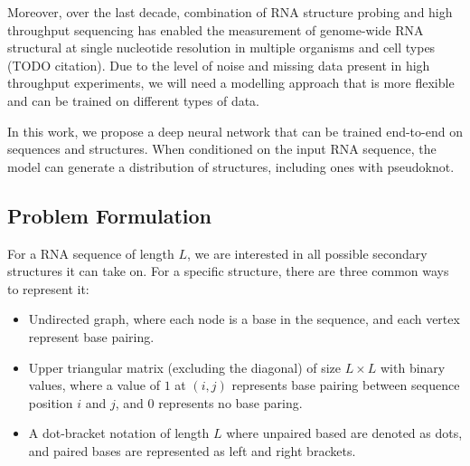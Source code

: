 \documentclass{article}
\begin{document}
Moreover, over the last decade,
combination of RNA structure probing and high throughput sequencing has enabled
the measurement of genome-wide RNA structural at single nucleotide resolution in multiple organisms and cell types (TODO citation).
Due to the level of noise and missing data present in high throughput experiments,
we will need a modelling approach that is more flexible and can be trained on different types of data.
%

In this work, we propose a deep neural network that can be trained end-to-end on
sequences and structures. When conditioned on the input RNA sequence,
the model can generate a distribution of structures, including ones with pseudoknot.


%
%

\subsection{Problem Formulation}

For a RNA sequence of length $L$, we are interested in all possible secondary structures it can take on.
For a specific structure, there are three common ways to represent it:

\begin{itemize}

    \item Undirected graph, where each node is a base in the sequence, and each vertex represent base pairing.

    \item Upper triangular matrix (excluding the diagonal)
of size $L \times L$ with binary values, where a value of $1$ at $(i, j)$ represents
base pairing between sequence position $i$ and $j$, and $0$ represents no base paring.

    \item A dot-bracket notation of length $L$ where unpaired based are denoted as dots,
    and paired bases are represented as left and right brackets.

\end{itemize}
\end{document}
